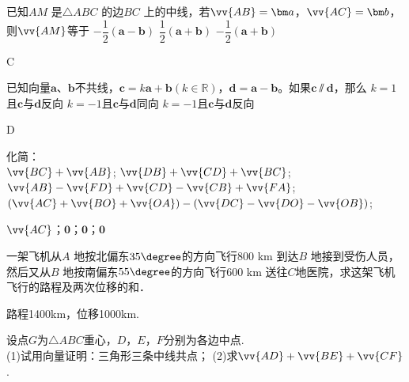 \begin{exercise}
      已知$AM$ 是$\triangle ABC$ 的边$BC$ 上的中线，若$\vv{AB}=\bm a$，$\vv{AC}=\bm b$，则$\vv{AM}$等于\xz
        {$-\dfrac12(\bm a-\bm b)$}
        {$\dfrac12(\bm a+\bm b)$}
        {$-\dfrac12(\bm a+\bm b)$}
      \begin{answer}
        C
      \end{answer}
    \item%
      已知向量$\bm a$、$\bm b$不共线，$\bm c=k\bm a+\bm b({k\in\mathbb{R}})$，$\bm d=\bm a-\bm b$。如果$\bm c\varparallel \bm d$，那么\xz
        {$k=1$且$\bm c$与$\bm d$反向}
        {$k=-1$且$\bm c$与$\bm d$同向}
        {$k=-1$且$\bm c$与$\bm d$反向}
      \begin{answer}
        D
      \end{answer}
    \item%
      化简：\\
       $\vv{BC}+\vv{AB}$; \hspace{2em}  $\vv{DB}+\vv{CD}+\vv{BC}$;\\
       $\vv{AB}-\vv{FD}+\vv{CD}-\vv{CB}+\vv{FA}$;\hspace{2em}  $(\vv{AC}+\vv{BO}+\vv{OA})-(\vv{DC}-\vv{DO}-\vv{OB})$;\\
      \begin{answer}
        $\vv{AC}$；$\bm 0$；$\bm 0$；$\bm 0$
      \end{answer}
    \vspace{1.5cm}
    \clearpage
    \item%
      一架飞机从$A$ 地按北偏东$35\degree$的方向飞行800 km 到达$B$ 地接到受伤人员，然后又从$B$ 地按南偏东$55\degree$的方向飞行600 km 送往$C $地医院，求这架飞机飞行的路程及两次位移的和．
      \begin{answer}
        路程1400km，位移1000km.
      \end{answer}
    \vspace{3cm}
    \item
      设点$G$为$\triangle ABC$重心，$D$，$E$，$F$分别为各边中点.\\
      (1)试用向量证明：三角形三条中线共点；
      (2)求$\vv{AD}+\vv{BE}+\vv{CF}$.
      \begin{flushright}
\end{flushright}
\end{exercise}

